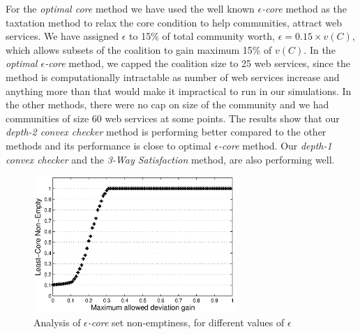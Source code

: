 For the \emph{optimal core} method we have used the well known \emph{$\epsilon$-core} method as the
taxtation method to relax the core condition to help communities, attract web services.
We have assigned $\epsilon$ to 15\% of total community worth, $\epsilon = 0.15 \times v(C)$, which allows
subsets of the coalition to gain maximum 15\% of $v(C)$. In the
\emph{optimal $\epsilon$-core} method, we capped the coalition
size to 25 web services, since the method is computationally
intractable as number of web services increase and anything more than that would make it
impractical to run in our simulations. In the other methods, there
were no cap on size of the community and we had communities of
size 60 web services at some points. The results show that our
\emph{depth-2 convex checker} method is performing better compared
to the other methods and its performance is close to optimal
\emph{$\epsilon$-core} method. Our \emph{depth-1 convex checker}
and the \emph{3-Way Satisfaction} method, are also performing well.

\begin{figure}[!t]
\centering
\includegraphics[width=3in]{Figures/least_core.eps}
\caption{Analysis of \emph{$\epsilon$-core} set non-emptiness, for different values of $\epsilon$} \label{f_leastcore}
\end{figure}

